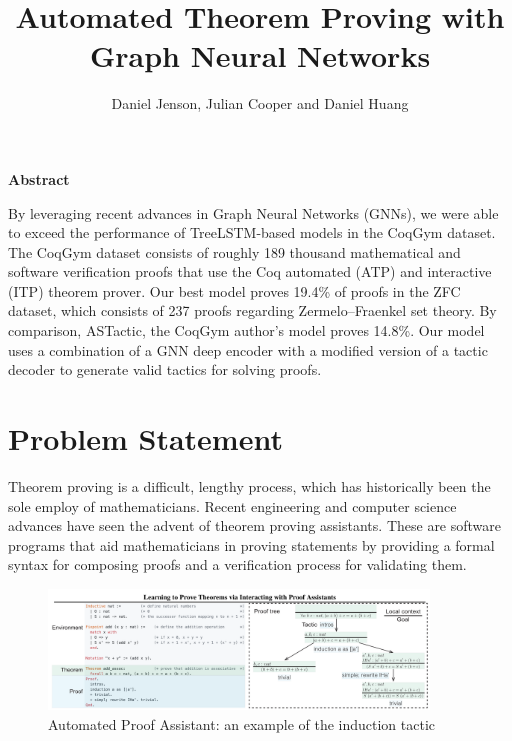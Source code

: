 \documentclass{article}
\title{%
    Automated Theorem Proving with Graph Neural Networks}
\author{Daniel Jenson, Julian Cooper and Daniel Huang}
\begin{document}
\maketitle




\begin{center}
\large\textbf{Abstract} \\
\end{center}
By leveraging recent advances in Graph Neural Networks (GNNs), we were able to exceed the performance of TreeLSTM-based models in the CoqGym dataset. The CoqGym dataset consists of roughly 189 thousand mathematical and software verification proofs that use the Coq automated (ATP) and interactive (ITP) theorem prover. Our best model proves 19.4\% of proofs in the ZFC dataset, which consists of 237 proofs regarding Zermelo–Fraenkel set theory. By comparison, ASTactic, the CoqGym author's model proves 14.8\%. Our model uses a combination of a GNN deep encoder with a modified version of a tactic decoder to generate valid tactics for solving proofs.

\section{Problem Statement}
Theorem proving is a difficult, lengthy process, which has historically been the sole employ of mathematicians. Recent engineering and computer science advances have seen the advent of theorem proving assistants. These are software programs that aid mathematicians in proving statements by providing a formal syntax for composing proofs and a verification process for validating them. \\

\begin{figure}[h]
    \centering
    \includegraphics[width=0.9\textwidth]{images/proof_assistant_example.png}
    \caption{Automated Proof Assistant: an example of the induction tactic \cite{coqgym}}
    \label{fig:atp}
\end{figure}
\end{document}
